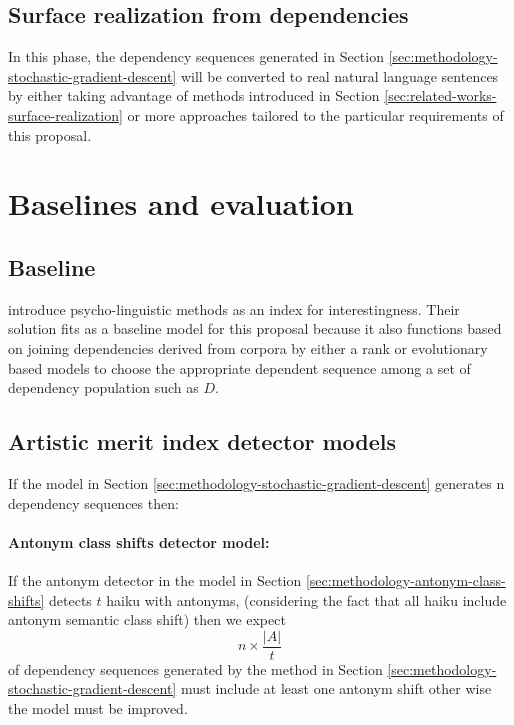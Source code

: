 \documentclass{article}
\begin{document}
	\subsection{Surface realization from dependencies}
	In this phase, the dependency sequences generated in Section \ref{sec:methodology-stochastic-gradient-descent} will be converted to real natural language sentences by either taking advantage of methods introduced in Section \ref{sec:related-works-surface-realization} or more approaches tailored to the particular requirements of this proposal. 
	
	\section{Baselines and evaluation} \label{sec:baselines-evaluations}
	\subsection{Baseline}
	\citet{mcintyre-2009-learning-to-tell-tales-a-data-driven-approach-to-story-generation, mcintyre-2010-plot-induction-and-evolutionary-search-for-story-generation} introduce psycho-linguistic methods as an index for interestingness. Their solution fits as a baseline model for this proposal because it also functions based on joining dependencies derived from corpora by either a rank or evolutionary based models to choose the appropriate dependent sequence among a set of dependency population such as $D$. 
	\subsection{Artistic merit index detector models} \label{sec:baselines-evaluations-artistic-merit-indexes}
	If the model in Section  \ref{sec:methodology-stochastic-gradient-descent} generates n dependency sequences then:
	\paragraph{Antonym class shifts detector model:} If the antonym detector in the model in Section \ref{sec:methodology-antonym-class-shifts} detects $t$ haiku with antonyms, (considering the fact that all haiku include antonym semantic class shift) then we expect 
	\begin{equation}
	n \times \frac{|A|}{t}
	\end{equation}
	of dependency sequences generated by the method in Section \ref{sec:methodology-stochastic-gradient-descent} must include at least one antonym shift other wise the model must be improved. 
\end{document}
